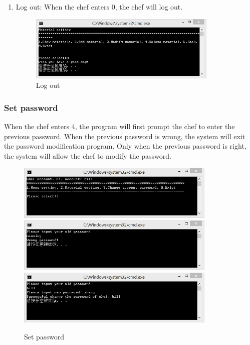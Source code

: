 \documentclass{article}
\begin{document}
\begin{enumerate}
    \item Log out:\newline
    When the chef enters 0, the chef will log out.
        \begin{figure}[H]
        \centering
        \includegraphics[width=0.85\textwidth]{Q/2/Q_0.jpg}
        \caption{Log out}
        \end{figure}
        
\end{enumerate}



\subsubsection{Set password}
When the chef enters 4, the program will first prompt the chef to enter the previous password. When the previous password is wrong, the system will exit the password modification program. Only when the previous password is right, the system will allow the chef to modify the password.
\begin{figure}[H]
    \centering
    \includegraphics[width=0.85\textwidth]{Q/3/Q3a.jpg}
    \includegraphics[width=0.85\textwidth]{Q/3/Q3b.jpg}
    \includegraphics[width=0.85\textwidth]{Q/3/Q3c.jpg}
    \caption{Set password}
\end{figure}
\end{document}
